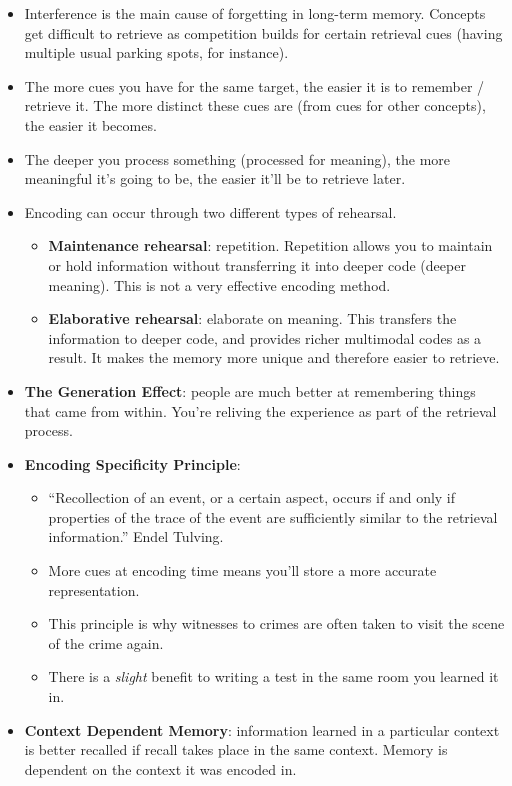\documentclass[]{article}
\begin{document}
\begin{itemize}
				\item Interference is the main cause of forgetting in long-term memory. Concepts get difficult to retrieve as competition builds for certain retrieval cues (having multiple usual parking spots, for instance).
				\item The more cues you have for the same target, the easier it is to remember / retrieve it. The more distinct these cues are (from cues for other concepts), the easier it becomes.
				\item The deeper you process something (processed for meaning), the more meaningful it's going to be, the easier it'll be to retrieve later.
				\item Encoding can occur through two different types of rehearsal.
					\begin{itemize}
						\item \textbf{Maintenance rehearsal}: repetition. Repetition allows you to maintain or hold information without transferring it into deeper code (deeper meaning). This is not a very effective encoding method.
						\item \textbf{Elaborative rehearsal}: elaborate on meaning. This transfers the information to deeper code, and provides richer multimodal codes as a result. It makes the memory more unique and therefore easier to retrieve.
					\end{itemize}
				\item \textbf{The Generation Effect}: people are much better at remembering things that came from within. You're reliving the experience as part of the retrieval process.
				\item \textbf{Encoding Specificity Principle}:
					\begin{itemize}
						\item ``Recollection of an event, or a certain aspect, occurs if and only if properties of the trace of the event are sufficiently similar to the retrieval information.'' \textendash Endel Tulving.
						\item More cues at encoding time means you'll store a more accurate representation.
						\item This principle is why witnesses to crimes are often taken to visit the scene of the crime again.
						\item There is a \emph{slight} benefit to writing a test in the same room you learned it in.
					\end{itemize}
				\item \textbf{Context Dependent Memory}: information learned in a particular context is better recalled if recall takes place in the same context. Memory is dependent on the context it was encoded in.

\end{itemize}
\end{document}
